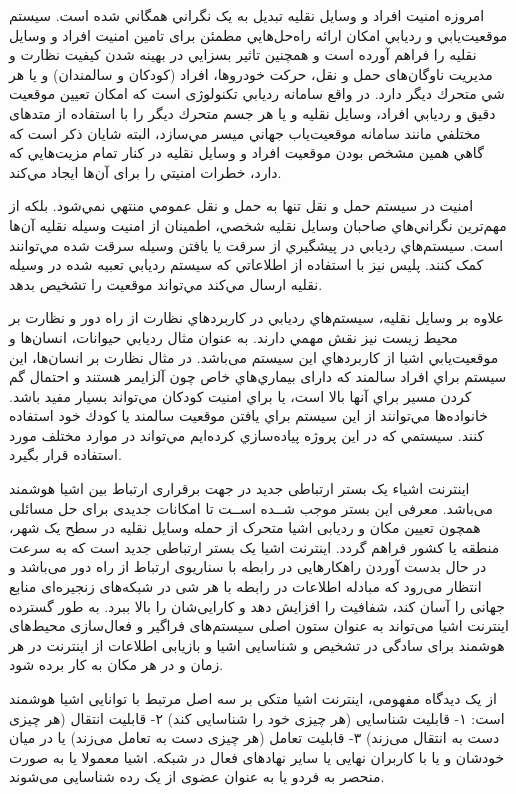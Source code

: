 امروزه امنيت افراد و وسايل نقليه تبديل به يک نگراني همگاني شده است. سيستم موقعيت‌يابي و رديابي امکان ارائه راه‌حل‌هايي مطمئن برای تامين امنيت افراد و وسايل نقليه را فراهم آورده است و همچنين تاثير بسزايي در بهينه شدن كيفيت نظارت و مديريت ناوگان‌های حمل و نقل، حركت خودروها، افراد (کودکان و سالمندان) و يا هر شي متحرك ديگر دارد. در واقع سامانه رديابي تکنولوژی است كه امکان تعيين موقعيت دقيق و رديابي افراد، وسايل نقليه و يا هر جسم متحرك ديگر را با استفاده از متدهای مختلفي مانند سامانه موقعيت‌‌یاب جهاني  ميسر مي‌سازد، البته شايان ذكر است كه گاهي همين مشخص بودن موقعيت افراد و وسايل نقليه در كنار تمام مزيت‌هايي كه دارد، خطرات امنيتي را برای آن‌ها ايجاد مي‌كند. \cite{Rahman2016}


امنيت در سيستم حمل و نقل تنها به حمل و نقل عمومي منتهي نمي‌شود. بلكه از مهم‌ترین نگراني‌هاي صاحبان وسايل نقليه شخصي، اطمينان از امنيت وسيله نقليه آن‌ها است. سيستم‌هاي رديابي در پيشگيري از سرقت يا یافتن وسيله سرقت شده مي‌توانند كمک كنند. پلیس نيز با استفاده از
اطلاعاتي كه سيستم رديابي تعبیه شده در وسيله نقليه ارسال مي‌كند مي‌تواند موقعيت را تشخيص بدهد.


علاوه بر وسايل نقليه، سيستم‌هاي رديابي در كاربردهاي نظارت از راه دور و نظارت بر محیط زیست نيز نقش مهمي دارند. به عنوان مثال رديابي حيوانات، انسان‌ها و موقعيت‌يابي اشيا از كاربردهاي اين سيستم می‌باشد. در مثال نظارت بر انسان‌ها، اين سيستم براي افراد سالمند كه دارای بيماري‌هاي خاص چون آلزايمر هستند و احتمال گم كردن مسير براي آنها بالا است، يا براي امنيت كودكان مي‌تواند بسيار مفيد باشد. خانواده‌ها مي‌توانند از اين سيستم براي يافتن موقعيت سالمند يا كودك خود استفاده كنند\cite{Saranya2013}. سيستمي كه در اين پروژه پياده‌سازي كرده‌ايم مي‌تواند در موارد مختلف مورد استفاده قرار بگيرد.


اینترنت اشیاء یک بستر ارتباطی جدید در جهت برقراری ارتباط بین اشیا هوشمند می‌باشد. معرفی این بستر موجب شــده اســت تا امکانات جدیدی برای حل مسائلی همچون تعیین مکان و ردیابی اشیا متحرک از حمله وسایل نقلیه در سطح یک شهر، منطقه یا کشور فراهم گردد.
اینترنت اشیا یک بستر ارتباطی جدید است که به سرعت در حال بدست آوردن راهکارهایی در رابطه با سناریوی ارتباط از راه دور می‌باشد و انتظار می‌رود که مبادله اطلاعات در رابطه با هر شی در شبکه‌های زنجیره‌ای منابع جهانی را آسان کند، شفافیت را افزایش دهد و کارایی‌شان را بالا ببرد. به طور گسترده اینترنت اشیا می‌تواند به عنوان ستون اصلی سیستم‌های فراگیر و فعال‌سازی محیط‌های هوشمند برای سادگی در تشخیص و شناسایی اشیا و بازیابی اطلاعات از اینترنت در هر زمان و در هر مکان به کار برده شود.


از یک دیدگاه مفهومی، اینترنت اشیا متکی بر سه اصل مرتبط با توانایی اشیا هوشمند است: ۱- قابلیت شناسایی (هر چیزی خود را شناسایی کند) ۲- قابلیت انتقال (هر چیزی دست به انتقال می‌زند) ۳- قابلیت تعامل (هر چیزی دست به تعامل می‌زند) یا در میان خودشان و یا با کاربران نهایی یا سایر نهادهای فعال در شبکه. اشیا معمولا یا به صورت منحصر به فردو یا به عنوان عضوی از یک رده شناسایی می‌شوند.


